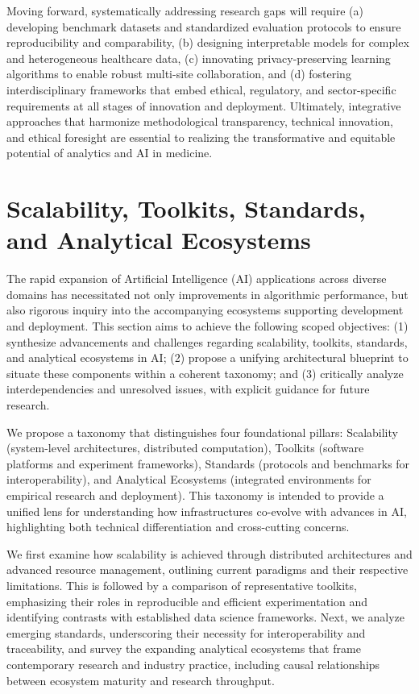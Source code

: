 \documentclass[sigconf]{acmart}
\begin{document}
Moving forward, systematically addressing research gaps will require (a) developing benchmark datasets and standardized evaluation protocols to ensure reproducibility and comparability, (b) designing interpretable models for complex and heterogeneous healthcare data, (c) innovating privacy-preserving learning algorithms to enable robust multi-site collaboration, and (d) fostering interdisciplinary frameworks that embed ethical, regulatory, and sector-specific requirements at all stages of innovation and deployment. Ultimately, integrative approaches that harmonize methodological transparency, technical innovation, and ethical foresight are essential to realizing the transformative and equitable potential of analytics and AI in medicine.

\section{Scalability, Toolkits, Standards, and Analytical Ecosystems}

The rapid expansion of Artificial Intelligence (AI) applications across diverse domains has necessitated not only improvements in algorithmic performance, but also rigorous inquiry into the accompanying ecosystems supporting development and deployment. This section aims to achieve the following scoped objectives: (1) synthesize advancements and challenges regarding scalability, toolkits, standards, and analytical ecosystems in AI; (2) propose a unifying architectural blueprint to situate these components within a coherent taxonomy; and (3) critically analyze interdependencies and unresolved issues, with explicit guidance for future research.

We propose a taxonomy that distinguishes four foundational pillars: Scalability (system-level architectures, distributed computation), Toolkits (software platforms and experiment frameworks), Standards (protocols and benchmarks for interoperability), and Analytical Ecosystems (integrated environments for empirical research and deployment). This taxonomy is intended to provide a unified lens for understanding how infrastructures co-evolve with advances in AI, highlighting both technical differentiation and cross-cutting concerns.

We first examine how scalability is achieved through distributed architectures and advanced resource management, outlining current paradigms and their respective limitations. This is followed by a comparison of representative toolkits, emphasizing their roles in reproducible and efficient experimentation and identifying contrasts with established data science frameworks. Next, we analyze emerging standards, underscoring their necessity for interoperability and traceability, and survey the expanding analytical ecosystems that frame contemporary research and industry practice, including causal relationships between ecosystem maturity and research throughput.
\end{document}
